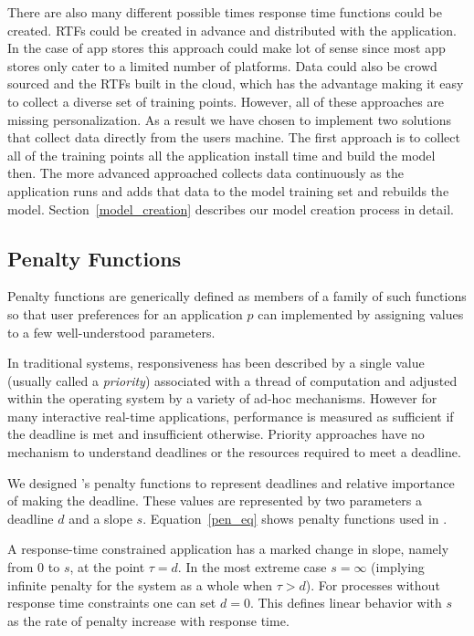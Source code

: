 There are also many different possible times response time functions could be created.  RTFs could be created in advance and distributed with the application. In the case of app stores this approach could make lot of sense since most app stores only cater to a limited number of platforms. Data could also be crowd sourced and the RTFs built in the cloud, which has the advantage making it easy to collect a diverse set of training points.  However, all of these approaches are missing personalization.  As a result we have chosen to implement two solutions that collect data directly from the users machine.  The first approach is to collect all of the training points all the application install time and build the model then.  The more advanced approached collects data continuously as the application runs and adds that data to the model training set and rebuilds the model.  Section~\ref{model_creation} describes our model creation process in detail.

\subsection*{Penalty Functions}

Penalty functions are generically defined as members of a family of such functions
so that user preferences for an application $p$ can implemented by assigning values to a few well-understood parameters.

In traditional systems, responsiveness has been described by a single value (usually called a \emph{priority}) associated with a thread of computation and adjusted within the operating system by a variety of ad-hoc mechanisms.  However for many interactive real-time applications, performance is measured as sufficient if the deadline is met and insufficient otherwise. Priority approaches have no mechanism to understand deadlines or the resources required to meet a deadline.   

We designed \pacora's penalty functions to represent deadlines and relative importance of making the deadline.  These values are represented by two parameters a deadline $d$ and a slope $s$.  Equation~\ref{pen_eq} shows penalty functions used in \pacora.

A response-time constrained application has a marked change in slope, namely from 0 to $s$, at the point $\tau= d$. In the most extreme case $s = \infty$ (implying infinite penalty for the system as a whole when $\tau > d$).  For processes without response time constraints one can set $d = 0$. This defines linear behavior with $s$ as the rate of penalty increase with response time.


